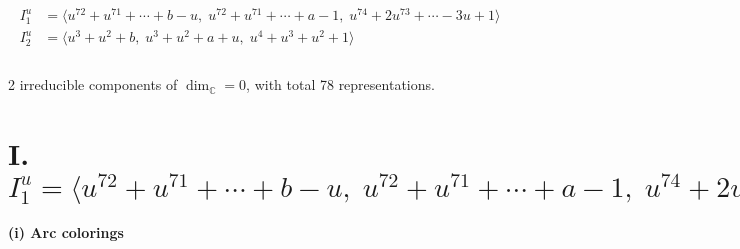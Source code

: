\documentclass[1p]{elsarticle_modified}
\theoremstyle{definition}
\begin{document}
\begin{align*}
I^u_{1}&=\langle 
u^{72}+u^{71}+\cdots+b- u,\;u^{72}+u^{71}+\cdots+a-1,\;u^{74}+2 u^{73}+\cdots-3 u+1\rangle \\
I^u_{2}&=\langle 
u^3+u^2+b,\;u^3+u^2+a+u,\;u^4+u^3+u^2+1\rangle \\
\\
\end{align*}
\raggedright * 2 irreducible components of $\dim_{\mathbb{C}}=0$, with total 78 representations.\\
\newpage
\renewcommand{\arraystretch}{1}
\centering \section*{I. $I^u_{1}= \langle u^{72}+u^{71}+\cdots+b- u,\;u^{72}+u^{71}+\cdots+a-1,\;u^{74}+2 u^{73}+\cdots-3 u+1 \rangle$}
\flushleft \textbf{(i) Arc colorings}\\
\end{document}
